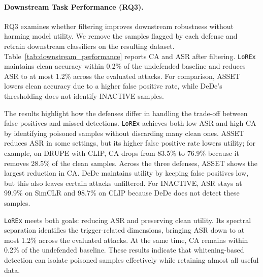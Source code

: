\documentclass[letterpaper,twocolumn,10pt]{article}
\begin{document}
\paragraph{Downstream Task Performance (RQ3).}
RQ3 examines whether filtering improves downstream robustness without harming model utility. 
We remove the samples flagged by each defense and retrain downstream classifiers on the resulting dataset. 
Table~\ref{tab:downstream_performance} reports CA and ASR after filtering. 
\texttt{LoREx} maintains clean accuracy within 0.2\% of the undefended baseline and reduces ASR to at most 1.2\% across the evaluated attacks. 
For comparison, ASSET lowers clean accuracy due to a higher false positive rate, while DeDe's thresholding does not identify INACTIVE samples.



The results highlight how the defenses differ in handling the trade-off between false positives and missed detections. 
\texttt{LoREx} achieves both low ASR and high CA by identifying poisoned samples without discarding many clean ones. 
ASSET reduces ASR in some settings, but its higher false positive rate lowers utility; for example, on DRUPE with CLIP, CA drops from 83.5\% to 76.9\% because it removes 28.5\% of the clean samples. 
Across the three defenses, ASSET shows the largest reduction in CA. 
DeDe maintains utility by keeping false positives low, but this also leaves certain attacks unfiltered. 
For INACTIVE, ASR stays at 99.9\% on SimCLR and 98.7\% on CLIP because DeDe does not detect these samples.


\texttt{LoREx} meets both goals: reducing ASR and preserving clean utility. 
Its spectral separation identifies the trigger-related dimensions, bringing ASR down to at most 1.2\% across the evaluated attacks. 
At the same time, CA remains within 0.2\% of the undefended baseline. 
These results indicate that whitening-based detection can isolate poisoned samples effectively while retaining almost all useful data.
\end{document}
